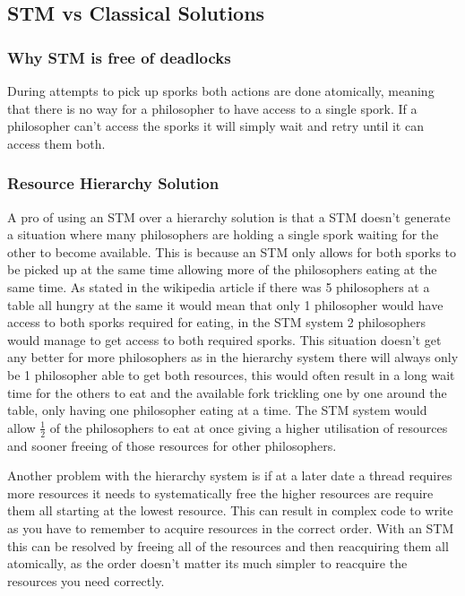 \documentclass[a4paper]{article}
\begin{document}
\subsection{STM vs Classical Solutions}

\subsubsection{Why STM is free of deadlocks}
During attempts to pick up sporks both actions are done atomically, meaning that there is no way for a philosopher to have access to a single spork.
If a philosopher can't access the sporks it will simply wait and retry until it can access them both.

\subsubsection{Resource Hierarchy Solution}
A pro of using an STM over a hierarchy solution is that a STM doesn't generate a situation where many philosophers are holding a single spork waiting for the other to become available.
This is because an STM only allows for both sporks to be picked up at the same time allowing more of the philosophers eating at the same time.
As stated in the wikipedia article if there was 5 philosophers at a table all hungry at the same it would mean that only 1 philosopher would have access to both sporks required for eating, in the STM system 2 philosophers would manage to get access to both required sporks.
This situation doesn't get any better for more philosophers as in the hierarchy system there will always only be 1 philosopher able to get both resources, this would often result in a long wait time for the others to eat and the available fork trickling one by one around the table, only having one philosopher eating at a time.
The STM system would allow \( \frac{1}{2}\) of the philosophers to eat at once giving a higher utilisation of resources and sooner freeing of those resources for other philosophers.
\par
Another problem with the hierarchy system is if at a later date a thread requires more resources it needs to systematically free the higher resources are require them all starting at the lowest resource.
This can result in complex code to write as you have to remember to acquire resources in the correct order.
With an STM this can be resolved by freeing all of the resources and then reacquiring them all atomically, as the order doesn't matter its much simpler to reacquire the resources you need correctly.
\end{document}
